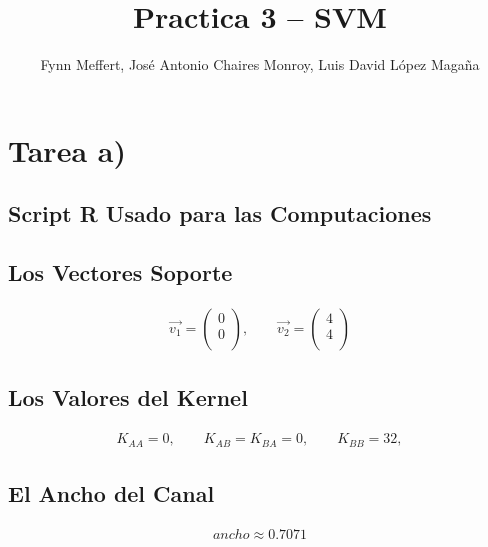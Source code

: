 \documentclass[fleqn]{llncs}
\begin{document}
\title{Practica 3 -- SVM}

\author{Fynn Meffert, José Antonio Chaires Monroy, Luis David López Magaña}

\maketitle

\vspace{1cm} %

\section{Tarea a)}

\subsection{Script R Usado para las Computaciones}


\newpage

\subsection{Los Vectores Soporte}
\begin{align*}
	\overrightarrow{v_1} =
		\begin{pmatrix}
			0 \\
			0 \\
		\end{pmatrix},
	\qquad
	\overrightarrow{v_2} =
		\begin{pmatrix}
			4 \\
			4 \\
		\end{pmatrix}
\end{align*}

\subsection{Los Valores del Kernel}
\begin{align*}
	K_{AA} = 0,
	\qquad
	K_{AB} = K_{BA} = 0,
	\qquad
	K_{BB} = 32,
\end{align*}

\subsection{El Ancho del Canal}
\begin{align*}
	ancho \approx 0.7071
\end{align*}
\end{document}
